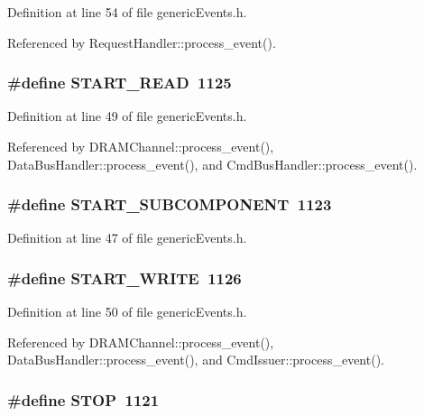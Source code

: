 Definition at line 54 of file genericEvents.h.

Referenced by RequestHandler::process\_\-event().
\subsubsection[{START\_\-READ}]{\setlength{\rightskip}{0pt plus 5cm}\#define START\_\-READ~1125}\label{genericEvents_8h_b22aca062f95f51b88da34a7112be0f5}




Definition at line 49 of file genericEvents.h.

Referenced by DRAMChannel::process\_\-event(), DataBusHandler::process\_\-event(), and CmdBusHandler::process\_\-event().
\subsubsection[{START\_\-SUBCOMPONENT}]{\setlength{\rightskip}{0pt plus 5cm}\#define START\_\-SUBCOMPONENT~1123}\label{genericEvents_8h_e053a7ba5bd3d51d8a61e2bb97ce9f43}




Definition at line 47 of file genericEvents.h.
\subsubsection[{START\_\-WRITE}]{\setlength{\rightskip}{0pt plus 5cm}\#define START\_\-WRITE~1126}\label{genericEvents_8h_e5d67b84de79bbad62ac943ed9ba82d8}




Definition at line 50 of file genericEvents.h.

Referenced by DRAMChannel::process\_\-event(), DataBusHandler::process\_\-event(), and CmdIssuer::process\_\-event().
\subsubsection[{STOP}]{\setlength{\rightskip}{0pt plus 5cm}\#define STOP~1121}\label{genericEvents_8h_e19b6bb2940d2fbe0a79852b070eeafd}




